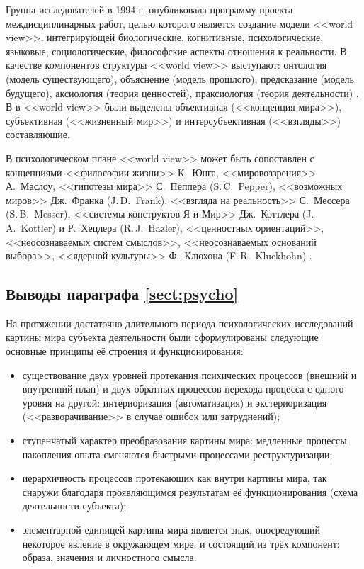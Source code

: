 Группа исследователей \cite{Aerts1994} в 1994 г. опубликовала программу проекта междисциплинарных работ, целью которого является создание модели <<world view>>, интегрирующей биологические, когнитивные, психологические, языковые, социологические, философские аспекты отношения к реальности. В качестве компонентов структуры <<world view>> выступают: онтология (модель существующего), объяснение (модель прошлого), предсказание (модель будущего), аксиология (теория ценностей), праксиология (теория деятельности) \cite{Aerts1994}. В \cite{Vidal2012} в <<world view>> были выделены объективная (<<концепция мира>>), субъективная (<<жизненный мир>>) и интерсубъективная (<<взгляды>>) составляющие. 

В психологическом плане <<world view>> может быть сопоставлен с концепциями <<философии жизни>> К.~Юнга, <<мировоззрения>> А.~Маслоу, <<гипотезы мира>> С.~Пеппера (S.\,C.~Pepper), <<возможных миров>> Дж.~Франка (J.\,D.~Frank), <<взгляда на реальность>> С.~Мессера (S.\,B.~Messer), <<системы конструктов Я-и-Мир>> Дж.~Коттлера (J.\,A.~Kottler) и Р.~Хецлера (R.\,J.~Hazler), <<ценностных ориентаций>>, <<неосознаваемых систем смыслов>>, <<неосознаваемых оснований выбора>>, <<ядерной культуры>> Ф.~Клюхона (F.\,R.~Kluckhohn) \cite{Koltko-Rivera2004}. 

\subsection{Выводы параграфа \ref{sect:psycho}}

На протяжении достаточно длительного периода психологических исследований картины мира субъекта деятельности были сформулированы следующие основные принципы её строения и функционирования:
\begin{itemize}
	\item существование двух уровней протекания психических процессов (внешний и внутренний план) и двух обратных процессов перехода процесса с одного уровня на другой: интериоризация (автоматизация) и экстериоризация (<<разворачивание>> в случае ошибок или затруднений);
	\item ступенчатый характер преобразования картины мира: медленные процессы накопления опыта сменяются быстрыми процессами реструктуризации;
	\item иерархичность процессов протекающих как внутри картины мира, так снаружи благодаря проявляющимся результатам её функционирования (схема деятельности субъекта);
	\item элементарной единицей картины мира является знак, опосредующий некоторое явление в окружающем мире, и состоящий из трёх компонент: образа, значения и личностного смысла.
\end{itemize}

